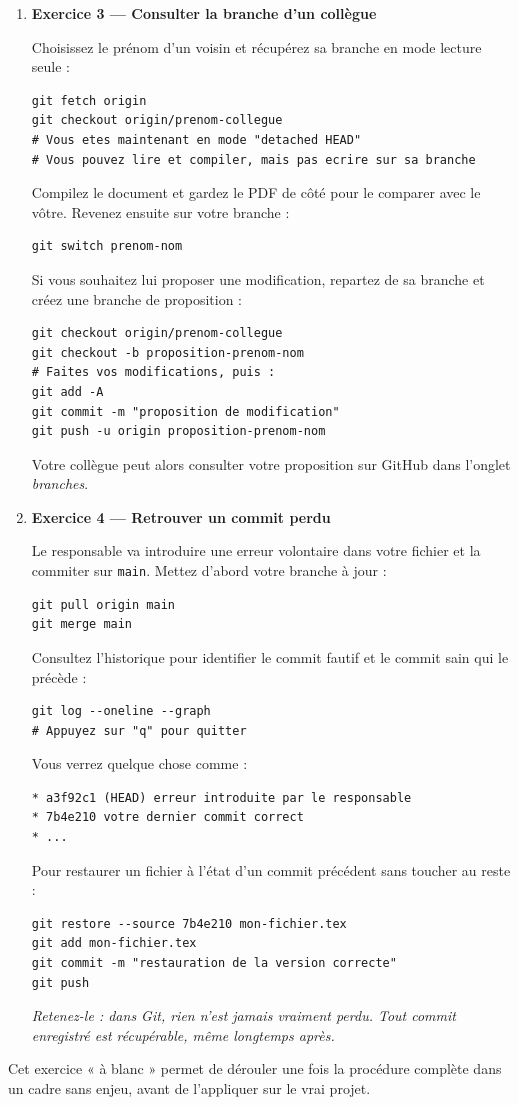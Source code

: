 \documentclass[11pt,a4paper]{article}
\begin{document}
\begin{enumerate}
	Je mets alors sa branche à jour avec votre version :
	\begin{lstlisting}[style=bashstyle]
git fetch origin
git reset --hard origin/conflitTest
	\end{lstlisting}
	\textit{Rappel : un conflit n'est pas une catastrophe. Tout le travail 
		des deux personnes est conservé --- il faut juste décider comment 
		les combiner.}
	\item \textbf{Exercice 3 — Consulter la branche d'un collègue}
	
	Choisissez le prénom d'un voisin et récupérez sa branche en mode lecture seule :
	\begin{lstlisting}[style=bashstyle]
git fetch origin
git checkout origin/prenom-collegue
# Vous etes maintenant en mode "detached HEAD"
# Vous pouvez lire et compiler, mais pas ecrire sur sa branche
	\end{lstlisting}
	Compilez le document et gardez le PDF de côté pour le comparer avec le vôtre. 
	Revenez ensuite sur votre branche :
	\begin{lstlisting}[style=bashstyle]
git switch prenom-nom
	\end{lstlisting}
	Si vous souhaitez lui proposer une modification, repartez de sa branche et créez une branche de proposition :
	\begin{lstlisting}[style=bashstyle]
git checkout origin/prenom-collegue
git checkout -b proposition-prenom-nom
# Faites vos modifications, puis :
git add -A
git commit -m "proposition de modification"
git push -u origin proposition-prenom-nom
	\end{lstlisting}
	Votre collègue peut alors consulter votre proposition sur GitHub dans l'onglet \emph{branches}.
	
	\item \textbf{Exercice 4 — Retrouver un commit perdu}
	
	Le responsable va introduire une erreur volontaire dans votre fichier et la commiter sur \texttt{main}. Mettez d'abord votre branche à jour :
	\begin{lstlisting}[style=bashstyle]
git pull origin main
git merge main
	\end{lstlisting}
	Consultez l'historique pour identifier le commit fautif et le commit sain qui le précède :
	\begin{lstlisting}[style=bashstyle]
git log --oneline --graph
# Appuyez sur "q" pour quitter
	\end{lstlisting}
	Vous verrez quelque chose comme :
	\begin{lstlisting}[style=plainstyle]
* a3f92c1 (HEAD) erreur introduite par le responsable
* 7b4e210 votre dernier commit correct
* ...
	\end{lstlisting}
	Pour restaurer un fichier à l'état d'un commit précédent sans toucher au reste :
	\begin{lstlisting}[style=bashstyle]
git restore --source 7b4e210 mon-fichier.tex
git add mon-fichier.tex
git commit -m "restauration de la version correcte"
git push
	\end{lstlisting}
	\textit{Retenez-le : dans Git, rien n'est jamais vraiment perdu. Tout commit enregistré est récupérable, même longtemps après.}
\end{enumerate}
Cet exercice « à blanc » permet de dérouler une fois la procédure complète dans un cadre sans enjeu, avant de l'appliquer sur le vrai projet.
\end{document}
